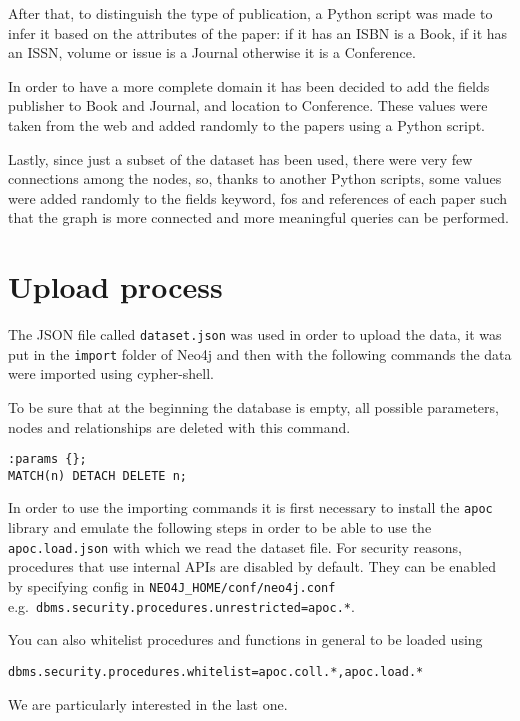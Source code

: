 After that, to distinguish the type of publication, a Python script was made to infer it based on the attributes of the paper: if it has an ISBN is a Book, if it has an ISSN, volume or issue is a Journal otherwise it is a Conference.

In order to have a more complete domain it has been decided to add the fields publisher to Book and Journal, and location to Conference.
These values were taken from the web and added randomly to the papers using a Python script.

Lastly, since just a subset of the dataset has been used, there were very few connections among the nodes, so, thanks to another Python scripts, some values were added randomly to the fields keyword, fos and references of each paper such that the graph is more connected and more meaningful queries can be performed.


\section{Upload process}
\label{sec:upload_process_neo4j}%
The JSON file called \verb|dataset.json| was used in order to upload the data, it was put in the \verb|import| folder of Neo4j and then with the following commands the data were imported using cypher-shell.

To be sure that at the beginning the database is empty, all possible parameters, nodes and relationships are deleted with this command.
\begin{lstlisting}[label={lst:lstlisting1}]
:params {};
MATCH(n) DETACH DELETE n;
\end{lstlisting}
In order to use the importing commands it is first necessary to install the \verb|apoc| library and emulate the following steps in order to be able to use the \verb|apoc.load.json| with which we read the dataset file.
For security reasons, procedures that use internal APIs are disabled by default.
They can be enabled by specifying config in \verb|NEO4J_HOME/conf/neo4j.conf| e.g.\ \verb|dbms.security.|\verb|procedures.unrestricted=apoc.*|.

You can also whitelist procedures and functions in general to be loaded using
\begin{center}
    \verb|dbms.security.procedures.whitelist=apoc.coll.*,apoc.load.*|
\end{center}
We are particularly interested in the last one.

